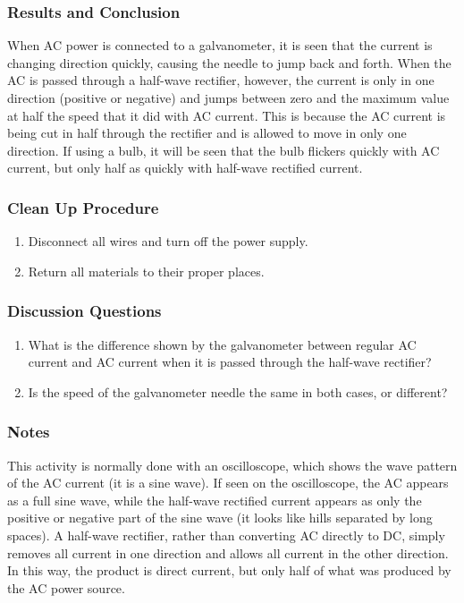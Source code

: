 \subsubsection*{Results and Conclusion}
When AC power is connected to a galvanometer, it is seen that the current is changing direction quickly, causing the needle to jump back and forth.  When the AC is passed through a half-wave rectifier, however, the current is only in one direction (positive or negative) and jumps between zero and the maximum value at half the speed that it did with AC current.
This is because the AC current is being cut in half through the rectifier and is allowed to move in only one direction.  If using a bulb, it will be seen that the bulb flickers quickly with AC current, but only half as quickly with half-wave rectified current.

\subsubsection*{Clean Up Procedure}
\begin{enumerate}
\item{Disconnect all wires and turn off the power supply.}
\item{Return all materials to their proper places.}
\end{enumerate}

\subsubsection*{Discussion Questions}
\begin{enumerate}
\item{What is the difference shown by the galvanometer between regular AC current and AC current when it is passed through the half-wave rectifier?}
\item{Is the speed of the galvanometer needle the same in both cases, or different?}
\end{enumerate}

\subsubsection*{Notes}
This activity is normally done with an oscilloscope, which shows the wave pattern of the AC current (it is a sine wave).  If seen on the oscilloscope, the AC appears as a full sine wave, while the half-wave rectified current appears as only the positive or negative part of the sine wave (it looks like hills separated by long spaces).
A half-wave rectifier, rather than converting AC directly to DC, simply removes all current in one direction and allows all current in the other direction.  In this way, the product is direct current, but only half of what was produced by the AC power source.
